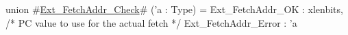 union #\hyperref[sailRISCVzExtzyFetchAddrzyCheck]{Ext\_FetchAddr\_Check}# ('a : Type) = {
  Ext_FetchAddr_OK  : xlenbits,  /* PC value to use for the actual fetch */
  Ext_FetchAddr_Error : 'a
}
